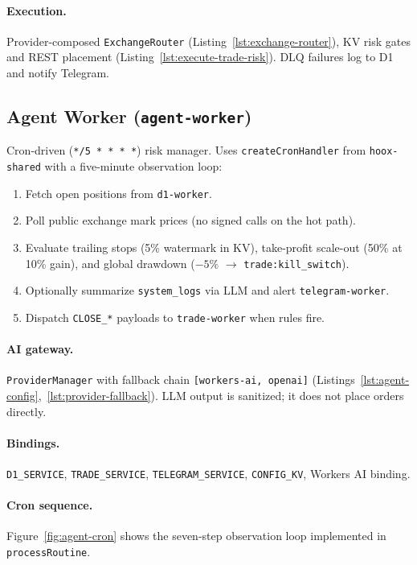 \paragraph{Execution.} Provider-composed \texttt{ExchangeRouter} (Listing~\ref{lst:exchange-router}), KV risk gates and REST placement (Listing~\ref{lst:execute-trade-risk}). DLQ failures log to D1 and notify Telegram.

\subsection{Agent Worker (\texttt{agent-worker})}

Cron-driven (\texttt{*/5 * * * *}) risk manager. Uses \texttt{createCronHandler} from \texttt{hoox-shared} with a five-minute observation loop:

\begin{enumerate}
  \item Fetch open positions from \texttt{d1-worker}.
  \item Poll public exchange mark prices (no signed calls on the hot path).
  \item Evaluate trailing stops (5\% watermark in KV), take-profit scale-out (50\% at 10\% gain), and global drawdown ($-5\%$ $\rightarrow$ \texttt{trade:kill\_switch}).
  \item Optionally summarize \texttt{system\_logs} via LLM and alert \texttt{telegram-worker}.
  \item Dispatch \texttt{CLOSE\_*} payloads to \texttt{trade-worker} when rules fire.
\end{enumerate}

\paragraph{AI gateway.} \texttt{ProviderManager} with fallback chain \texttt{[workers-ai, openai]} (Listings~\ref{lst:agent-config},~\ref{lst:provider-fallback}). LLM output is sanitized; it does not place orders directly.

\paragraph{Bindings.} \texttt{D1\_SERVICE}, \texttt{TRADE\_SERVICE}, \texttt{TELEGRAM\_SERVICE}, \texttt{CONFIG\_KV}, Workers AI binding.

\paragraph{Cron sequence.} Figure~\ref{fig:agent-cron} shows the seven-step observation loop implemented in \texttt{processRoutine}.

